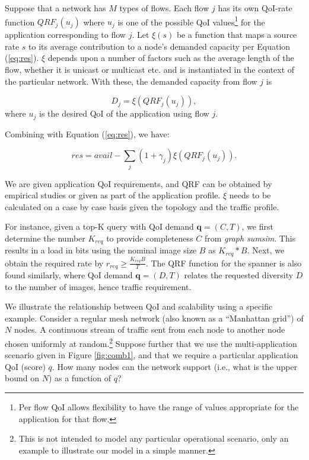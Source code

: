 


Suppose that a network has $M$ types of flows. Each flow $j$ has its own
QoI-rate function $QRF_j(u_j)$ where $u_j$ is one of the possible QoI
values\footnote{Per flow QoI allows flexibility to have the range of
values appropriate for the application for that flow.}
for the application corresponding to flow $j$. Let $\xi(s)$ be a function that
maps a source rate $s$ to its average contribution to a node's demanded
capacity per Equation (\ref{eq:res}).
$\xi$ depends upon a number of factors such as the
average length of the flow, whether it is unicast or multicast etc. and
is instantiated in the context of the particular network.
With these, the demanded capacity from flow $j$ is

\begin{equation}
D_j = \xi(QRF_j(u_j)),
\end{equation}
where $u_j$ is the desired QoI of the application using flow $j$.

Combining with Equation (\ref{eq:res}), we have:

\begin{equation}
res = avail - \sum_j (1+\gamma_j)\xi(QRF_j(u_j))   \label{eq:utility}.
\end{equation}

We are given application QoI requirements, and QRF can be obtained by
empirical studies or given as part of the application profile.
$\xi$ needs to be calculated on a case by case basis
given the topology and the traffic profile.

For instance, given a top-K query with QoI demand $\textbf{q}=(C,T)$, we first determine the number $K_{req}$ to provide completeness $C$ from \emph{graph sumsim}. This results in a load in bits using the nominal image size $B$ as $K_{req}*B$. Next, we obtain the required rate by $r_{req}\geq \frac{K_{req}B}{T}$. The QRF function for the spanner is also found similarly, where QoI demand $\textbf{q}=(D,T)$ relates the requested diversity $D$ to the number of images, hence traffic requirement.


We illustrate the relationship between QoI and scalability using a
 specific example.  Consider a
regular mesh network (also known as a ``Manhattan grid'') of $N$ nodes.
A continuous stream of traffic sent from each node to another node chosen
uniformly at random.\footnote{This is not
intended to model any particular operational scenario, only an
example to illustrate our model in a simple manner.}  Suppose
further that we use the multi-application scenario given in Figure
\ref{fig:comb1}, and that we
require a particular application QoI (score) $q$.  How
many nodes can the network support (i.e., what is the upper bound on
$N$) as a function of $q$?

